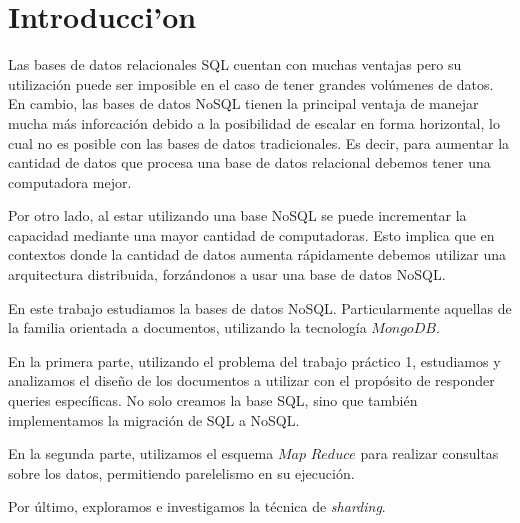 \section{Introducci'on}

Las bases de datos relacionales SQL cuentan con muchas ventajas pero su utilización puede ser imposible en el caso de tener grandes volúmenes de datos. En cambio, las bases de datos NoSQL tienen la principal ventaja de manejar mucha más inforcación debido a la posibilidad de escalar en forma horizontal, lo cual no es posible con las bases de datos tradicionales. Es decir, para aumentar la cantidad de datos que procesa una base de datos relacional debemos tener una computadora mejor. 

Por otro lado, al estar utilizando una base NoSQL se puede incrementar la capacidad mediante una mayor cantidad de computadoras. Esto implica que en contextos donde la cantidad de datos aumenta rápidamente debemos utilizar una arquitectura distribuida, forzándonos a usar una base de datos NoSQL. 

En este trabajo estudiamos la bases de datos NoSQL. Particularmente aquellas de la familia orientada a documentos, utilizando la tecnología $MongoDB$.

En la primera parte, utilizando el problema del trabajo práctico 1, estudiamos y analizamos el diseño de los documentos a utilizar con el propósito de responder queries específicas. No solo creamos la base SQL, sino que también implementamos la migración de SQL a NoSQL.


En la segunda parte, utilizamos el esquema $Map$ $Reduce$ para realizar consultas sobre los datos, permitiendo parelelismo en su ejecución.


Por último, exploramos e investigamos la técnica de \textit{sharding}.
